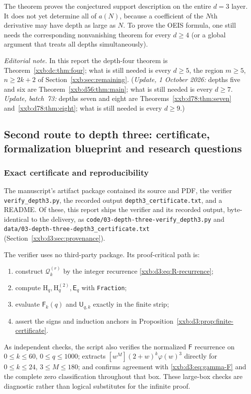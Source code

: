 \documentclass[11pt,a4paper]{article}
\numberwithin{equation}{section}
\theoremstyle{definition}
\theoremstyle{remark}
\theoremstyle{plain}
\begin{document}
The theorem proves the conjectured support description on the entire
$d=3$ layer.  It does not yet determine all of $a(N)$, because a coefficient
of the $N$th derivative may have depth as large as $N$.  To prove the OEIS
formula, one still needs the corresponding nonvanishing theorem for every
$d\geq4$ (or a global argument that treats all depths simultaneously).

\emph{Editorial note.}  In this report the depth-four theorem is
Theorem~\ref{xxb:dc:thm:four}; what is still needed is every $d\ge5$, the
region $m\ge5$, $n\ge2k+2$ of Section~\ref{xxb:sec:remaining}.
(\emph{Update, 1 October 2026:} depths five and six are
Theorem~\ref{xxb:d56:thm:main}; what is still needed is every $d\ge7$.
\emph{Update, batch~73:} depths seven and eight are
Theorems~\ref{xxb:d78:thm:seven} and~\ref{xxb:d78:thm:eight}; what is still
needed is every $d\ge9$.)

\subsection{Second route to depth three: certificate, formalization blueprint and research questions}\label{xxb:d3:sec:certificate}

\subsubsection{Exact certificate and reproducibility}\label{xxb:d3:sec:audit}

The manuscript's artifact package contained its source and PDF, the
verifier \texttt{verify\_\allowbreak depth3.py}, the recorded output
\texttt{depth3\_\allowbreak certificate.txt}, and a README.  Of these, this report ships
the verifier and its recorded output, byte-identical to the delivery, as
\texttt{code/03-depth-\allowbreak three-\allowbreak verify\_depth3.py} and
\texttt{data/03-depth-\allowbreak three-\allowbreak depth3\_certificate.txt}
(Section~\ref{xxb:d3:sec:provenance}).

The verifier uses no third-party package.  Its proof-critical path is:
\begin{enumerate}[nosep]
  \item construct $\mathcal Q_k^{(r)}$ by the integer recurrence
    \eqref{xxb:d3:eq:R-recurrence};
  \item compute $\mathrm H_q,\mathrm H_q^{(2)},\mathsf E_q$ with \texttt{Fraction};
  \item evaluate $\mathsf F_k(q)$ and $\mathsf U_{q,k}$ exactly in the finite strip;
  \item assert the signs and induction anchors in
    Proposition~\ref{xxb:d3:prop:finite-certificate}.
\end{enumerate}
As independent checks, the script also verifies the normalized $\mathsf F$
recurrence on $0\leq k\leq60$, $0\leq q\leq1000$; extracts
$[w^M](2+w)^k\varphi(w)^3$ directly for $0\leq k\leq24$, $3\leq M\leq180$; and
confirms agreement with \eqref{xxb:d3:eq:gamma-F} and the complete zero
classification throughout that box.  These large-box checks are diagnostic
rather than logical substitutes for the infinite proof.
\end{document}
